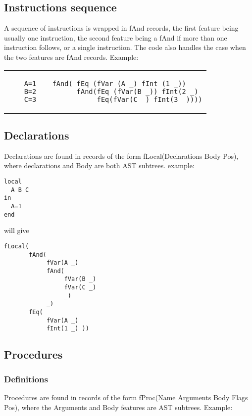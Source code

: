 \documentclass[a4paper]{memoir}
\begin{document}
\subsection{Instructions sequence}
A sequence of instructions is wrapped in fAnd records, the first feature being usually one instruction, the second feature being a fAnd if more than one instruction follows,  or a single instruction. The code also handles the case when the two features are fAnd records. %
Example:\\
\begin{tabular}{ p{} p{} }
  \begin{lstlisting}
    A=1
    B=2
    C=3
  \end{lstlisting}
&
  \footnotesize{
  \begin{verbatim}
  fAnd( fEq (fVar (A _) fInt (1 _))
        fAnd(fEq (fVar(B _)) fInt(2 _) 
             fEq(fVar(C _) fInt(3 _))))
  \end{verbatim}
  }
\end{tabular}

\subsection{Declarations}
Declarations are found in records of the form fLocal(Declarations Body Pos), where declarations and Body are both AST subtrees. 
example:

\begin{lstlisting}
local
  A B C
in
  A=1
end
\end{lstlisting}
will give
\begin{verbatim}
fLocal(
       fAnd(
            fVar(A _) 
            fAnd(
                 fVar(B _) 
                 fVar(C _) 
                 _) 
            _) 
       fEq( 
            fVar(A _) 
            fInt(1 _) ))
\end{verbatim}

\subsection{Procedures}
\subsubsection{Definitions}
Procedures are found in records of the form fProc(Name Arguments Body Flags Pos), where the Arguments and Body features are AST subtrees. %
Example:
\end{document}
